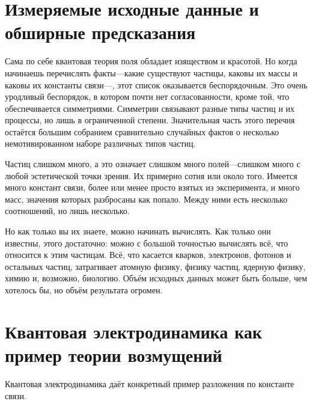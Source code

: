 \section{Измеряемые исходные данные и обширные предсказания}

Сама по себе квантовая теория поля обладает изяществом и красотой. Но когда начинаешь перечислять факты---какие существуют частицы, каковы их массы и каковы их константы связи---, этот список оказывается беспорядочным. Это очень уродливый беспорядок, в котором почти нет согласованности, кроме той, что обеспечивается симметриями. Симметрии связывают разные типы частиц и их процессы, но лишь в ограниченной степени. Значительная часть этого перечня остаётся большим собранием сравнительно случайных фактов о несколько немотивированном наборе различных типов частиц.

\begin{classroomqa}
\end{classroomqa}

Частиц слишком много, а это означает слишком много полей---слишком много с любой эстетической точки зрения. Их примерно сотня или около того. Имеется много констант связи, более или менее просто взятых из эксперимента, и много масс, значения которых разбросаны как попало. Между ними есть несколько соотношений, но лишь несколько.

Но как только вы их знаете, можно начинать вычислять. Как только они известны, этого достаточно: можно с большой точностью вычислять всё, что относится к этим частицам. Всё, что касается кварков, электронов, фотонов и остальных частиц, затрагивает атомную физику, физику частиц, ядерную физику, химию и, возможно, биологию. Объём исходных данных может быть больше, чем хотелось бы, но объём результата огромен.

\section{Квантовая электродинамика как пример теории возмущений}

Квантовая электродинамика даёт конкретный пример разложения по константе связи.

\begin{classroomqa}
\end{classroomqa}

